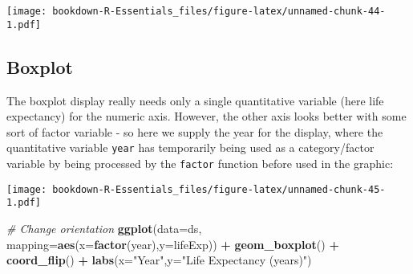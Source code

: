\documentclass[]{book}
\newenvironment{Shaded}{\begin{snugshade}}{\end{snugshade}}
\newcommand{\KeywordTok}[1]{\textcolor[rgb]{0.13,0.29,0.53}{\textbf{#1}}}
\newcommand{\DataTypeTok}[1]{\textcolor[rgb]{0.13,0.29,0.53}{#1}}
\newcommand{\DecValTok}[1]{\textcolor[rgb]{0.00,0.00,0.81}{#1}}
\newcommand{\StringTok}[1]{\textcolor[rgb]{0.31,0.60,0.02}{#1}}
\newcommand{\CommentTok}[1]{\textcolor[rgb]{0.56,0.35,0.01}{\textit{#1}}}
\newcommand{\OperatorTok}[1]{\textcolor[rgb]{0.81,0.36,0.00}{\textbf{#1}}}
\newcommand{\NormalTok}[1]{#1}
\begin{document}
\texttt{[image: bookdown-R-Essentials\_files/figure-latex/unnamed-chunk-44-1.pdf]}

\subsection{Boxplot}\label{boxplot}

The boxplot display really needs only a single quantitative variable
(here life expectancy) for the numeric axis. However, the other axis
looks better with some sort of factor variable - so here we supply the
year for the display, where the quantitative variable \texttt{year} has
temporarily being used as a category/factor variable by being processed
by the \texttt{factor} function before used in the graphic:

\begin{Shaded}
\end{Shaded}

\texttt{[image: bookdown-R-Essentials\_files/figure-latex/unnamed-chunk-45-1.pdf]}

\begin{Shaded}
\begin{Highlighting}[]
\CommentTok{# Change orientation}
\KeywordTok{ggplot}\NormalTok{(}\DataTypeTok{data=}\NormalTok{ds, }\DataTypeTok{mapping=}\KeywordTok{aes}\NormalTok{(}\DataTypeTok{x=}\KeywordTok{factor}\NormalTok{(year),}\DataTypeTok{y=}\NormalTok{lifeExp)) }\OperatorTok{+}
\StringTok{ }\KeywordTok{geom_boxplot}\NormalTok{() }\OperatorTok{+}\StringTok{ }
\StringTok{  }\KeywordTok{coord_flip}\NormalTok{() }\OperatorTok{+}\StringTok{ }
\StringTok{  }\KeywordTok{labs}\NormalTok{(}\DataTypeTok{x=}\StringTok{"Year"}\NormalTok{,}\DataTypeTok{y=}\StringTok{"Life Expectancy (years)"}\NormalTok{)}
\end{Highlighting}
\end{Shaded}
\end{document}
